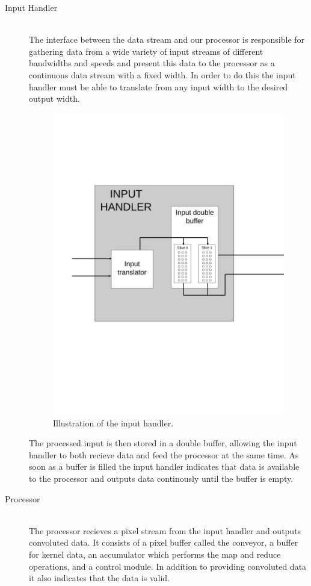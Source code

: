 \begin{description}
    \item[Input Handler] \hfill\\ 
        The interface between the data stream and our processor is responsible for gathering data from a wide variety of input streams of different bandwidths and speeds and present this data to the processor as a continuous data stream with a fixed width.
        In order to do this the input handler must be able to translate from any input width to the desired output width.

\begin{figure}[h!]
    \includegraphics[width=\linewidth]{img/input_handler.png}
    \caption{Illustration of the input handler.}
    \label{fig:Convolution}
\end{figure}

        The processed input is then stored in a double buffer, allowing the input handler to both recieve data and feed the processor at the same time.
        As soon as a buffer is filled the input handler indicates that data is available to the processor and outputs data continously until the buffer is empty.
    \item[Processor] \hfill\\
        The processor recieves a pixel stream from the input handler and outputs convoluted data. It consists of a pixel buffer called the conveyor, a buffer for kernel data, an accumulator which performs the map and reduce operations, and a control module. In addition to providing convoluted data it also indicates that the data is valid.


\end{description}
